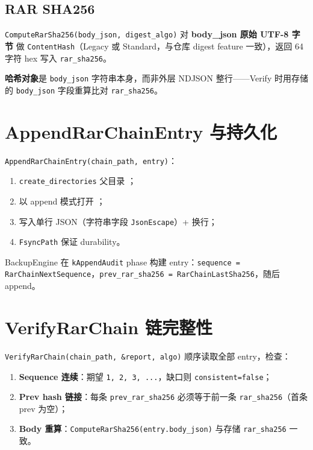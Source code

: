 \subsection{RAR SHA256}

\texttt{ComputeRarSha256(body\_json, digest\_algo)} 对 \textbf{body\_json 原始 UTF-8 字节} 做 \texttt{ContentHash}（Legacy 或 Standard，与仓库 digest feature 一致），返回 64 字符 hex 写入 \texttt{rar\_sha256}。

\textbf{哈希对象}是 \texttt{body\_json} 字符串本身，而非外层 NDJSON 整行——Verify 时用存储的 \texttt{body\_json} 字段重算比对 \texttt{rar\_sha256}。

\section{AppendRarChainEntry 与持久化}

\texttt{AppendRarChainEntry(chain\_path, entry)}：
\begin{enumerate}
  \item \texttt{create\_directories} 父目录 ；
  \item 以 append 模式打开 ；
  \item 写入单行 JSON（字符串字段 \texttt{JsonEscape}）+ 换行；
  \item \texttt{FsyncPath} 保证 durability。
\end{enumerate}

BackupEngine 在 \texttt{kAppendAudit} phase 构建 entry：\texttt{sequence = RarChainNextSequence}，\texttt{prev\_rar\_sha256 = RarChainLastSha256}，随后 append。

\section{VerifyRarChain 链完整性}

\texttt{VerifyRarChain(chain\_path, \&report, algo)} 顺序读取全部 entry，检查：

\begin{enumerate}
  \item \textbf{Sequence 连续}：期望 \texttt{1, 2, 3, ...}，缺口则 \texttt{consistent=false}；
  \item \textbf{Prev hash 链接}：每条 \texttt{prev\_rar\_sha256} 必须等于前一条 \texttt{rar\_sha256}（首条 prev 为空）；
  \item \textbf{Body 重算}：\texttt{ComputeRarSha256(entry.body\_json)} 与存储 \texttt{rar\_sha256} 一致。
\end{enumerate}

